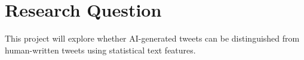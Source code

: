 \section*{Research Question}
This project will explore whether AI-generated tweets can be distinguished from human-written tweets using statistical text features.